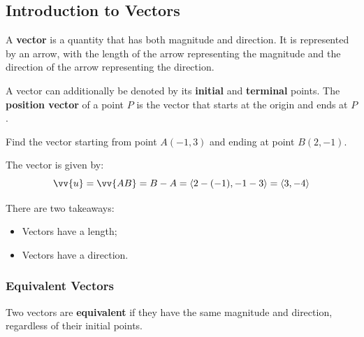 \documentclass{article}
\begin{document}
\subsection*{Introduction to Vectors}

A \textbf{vector} is a quantity that has both magnitude and direction. It is represented by an arrow, with the length of the arrow representing the magnitude and the direction of the arrow representing the direction.

\begin{notebox}
A vector can additionally be denoted by its \textbf{initial} and \textbf{terminal} points. The \textbf{position vector} of a point \( P \) is the vector that starts at the origin and ends at \( P \).
\end{notebox}

\begin{examplebox}
    Find the vector starting from point \( A(-1,3) \) and ending at point \( B(2,-1) \).
    \begin{solutionbox}
        The vector is given by:
        \[
            \vv{u} = \vv{AB} = B - A = \langle 2 - (-1), -1 - 3 \rangle = \langle 3, -4 \rangle
        \]
    \end{solutionbox}
\end{examplebox}
\begin{tipbox}
    There are two takeaways:
    \begin{itemize}
        \item Vectors have a length;
        \item Vectors have a direction.
    \end{itemize}
\end{tipbox}

\subsubsection*{Equivalent Vectors}

\begin{definitionbox}
    Two vectors are \textbf{equivalent} if they have the same magnitude and direction, regardless of their initial points.
\end{definitionbox}
\end{document}
